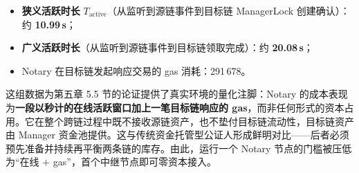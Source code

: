 \begin{itemize}
  \item \textbf{狭义活跃时长} $T_{\text{active}}$（从监听到源链事件到目标链 ManagerLock 创建确认）：约 \textbf{10.99\,s}；
  \item \textbf{广义活跃时长}（从监听到源链事件到目标链领取完成）：约 \textbf{20.08\,s}；
  \item Notary 在目标链发起响应交易的 gas 消耗：291\,678。
\end{itemize}

这组数据为第五章 5.5 节的论证提供了真实环境的量化注脚：Notary 的成本表现为\textbf{一段以秒计的在线活跃窗口加上一笔目标链响应的 gas}，而非任何形式的资本占用。它在整个跨链过程中既不接收源链资产，也不垫付目标链流动性，目标链资产由 Manager 资金池提供。这与传统资金托管型公证人形成鲜明对比——后者必须预先准备并持续再平衡两条链的库存。由此，运行一个 Notary 节点的门槛被压低为\textquotedblleft 在线 + gas\textquotedblright，首个中继节点即可零资本接入。
